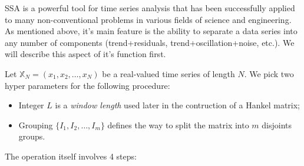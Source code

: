 SSA is a powerful tool for time series analysis that has been successfully
applied to many non-conventional problems in various fields of science and
engineering. As mentioned above, it's main feature is the ability to separate a
data series into any number of components (trend+residuals,
trend+oscillation+noise, etc.). We will describe this aspect of it's function 
first.

Let $\mathbb{X}_N=(x_1,x_2,\ldots,x_N)$ be a real-valued time series of length
$N$. We pick two hyper parameters for the following procedure:
\begin{itemize}
	\item Integer $L$ is a \textit{window length} used later in the contruction
	of a Hankel matrix;
	\item Grouping $\{I_1,I_2,\ldots,I_m\}$ defines the way to split the
	matrix into $m$ disjoints groups.
\end{itemize}
The operation itself involves 4 steps:

